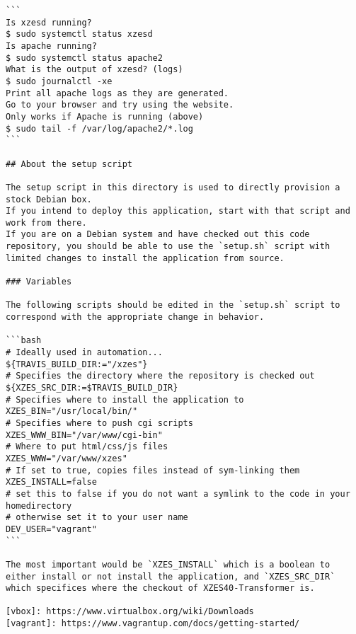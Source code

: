 \begin{lstlisting}[caption={Vagrant development environment README.}]
```
Is xzesd running?
$ sudo systemctl status xzesd
Is apache running?
$ sudo systemctl status apache2
What is the output of xzesd? (logs)
$ sudo journalctl -xe
Print all apache logs as they are generated.
Go to your browser and try using the website.
Only works if Apache is running (above)
$ sudo tail -f /var/log/apache2/*.log
```

## About the setup script

The setup script in this directory is used to directly provision a stock Debian box.
If you intend to deploy this application, start with that script and work from there.
If you are on a Debian system and have checked out this code repository, you should be able to use the `setup.sh` script with limited changes to install the application from source.

### Variables

The following scripts should be edited in the `setup.sh` script to correspond with the appropriate change in behavior.

```bash
# Ideally used in automation...
${TRAVIS_BUILD_DIR:="/xzes"}
# Specifies the directory where the repository is checked out
${XZES_SRC_DIR:=$TRAVIS_BUILD_DIR}
# Specifies where to install the application to
XZES_BIN="/usr/local/bin/"
# Specifies where to push cgi scripts
XZES_WWW_BIN="/var/www/cgi-bin"
# Where to put html/css/js files
XZES_WWW="/var/www/xzes"
# If set to true, copies files instead of sym-linking them
XZES_INSTALL=false
# set this to false if you do not want a symlink to the code in your homedirectory
# otherwise set it to your user name
DEV_USER="vagrant"
```

The most important would be `XZES_INSTALL` which is a boolean to either install or not install the application, and `XZES_SRC_DIR` which specifices where the checkout of XZES40-Transformer is.

[vbox]: https://www.virtualbox.org/wiki/Downloads
[vagrant]: https://www.vagrantup.com/docs/getting-started/
\end{lstlisting}
